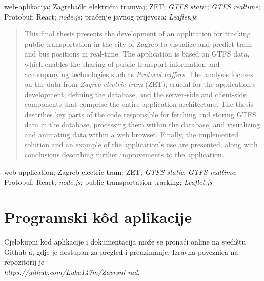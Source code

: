 \documentclass[zavrsnirad]{fer}
\begin{document}
\begin{kljucnerijeci}
  web-aplikacija; Zagrebački električni tramvaj; ZET; \textit{GTFS static}; \textit{GTFS realtime}; Protobuf; React; \textit{node.js}; praćenje javnog prijevoza; \textit{Leaflet.js}
\end{kljucnerijeci}


\begin{abstract}
	This final thesis presents the development of an application for tracking public transportation in the city of Zagreb to visualize and predict tram and bus positions in real-time. The application is based on GTFS data, which enables the sharing of public transport information and accompanying technologies such as \textit{Protocol buffers}. The analysis focuses on the data from \textit{Zagreb electric tram} (ZET), crucial for the application's development, defining the database, and the server-side and client-side components that comprise the entire application architecture. The thesis describes key parts of the code responsible for fetching and storing GTFS data in the database, processing them within the database, and visualizing and animating data within a web browser. Finally, the implemented solution and an example of the application's use are presented, along with conclusions describing further improvements to the application.
\end{abstract}

\begin{keywords}
  web application; Zagreb electric tram; ZET; \textit{GTFS static}; \textit{GTFS realtime}; Protobuf; React; \textit{node.js}; public transportation tracking; \textit{Leaflet.js}
\end{keywords}



\backmatter

\chapter{Programski k\^od aplikacije}
Cjelokupni kod aplikacije i dokumentacija može se pronaći online na sjedištu Github-a, gdje je dostupan za pregled i preuzimanje. Izravna poveznica na repozitorij je\\ \textit{https://github.com/Luka147m/Zavrsni-rad}.
\end{document}
